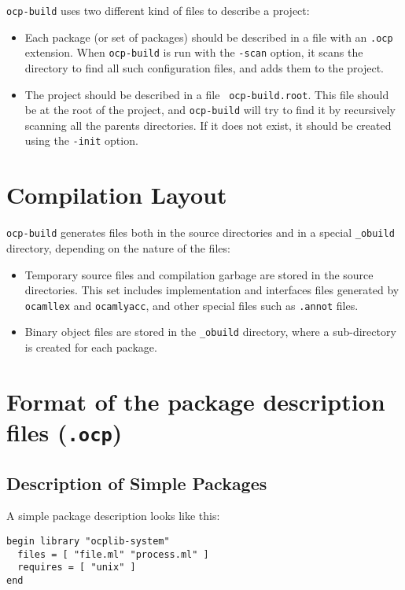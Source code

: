  {\tt ocp-build} uses two different kind of files to describe a project:
\begin{itemize}
\item Each package (or set of packages) should be described in a file
  with an {\tt .ocp} extension. When {\tt ocp-build} is run with the
  {\tt -scan} option, it scans the directory to find all such
  configuration files, and adds them to the project.
\item The project should be described in a file {\tt
  ocp-build.root}. This file should be at the root of the project, and
  {\tt ocp-build} will try to find it by recursively scanning all the
  parents directories. If it does not exist, it should be created using
  the {\tt -init} option.
\end{itemize}

\section{Compilation Layout}

{\tt ocp-build} generates files both in the source directories and in
a special {\tt \_obuild} directory, depending on the nature of the
files:
\begin{itemize}
\item Temporary source files and compilation garbage are stored in the
  source directories. This set includes implementation and interfaces
  files generated by {\tt ocamllex} and {\tt ocamlyacc}, and other
  special files such as {\tt .annot} files.
\item Binary object files are stored in the {\tt \_obuild} directory,
  where a sub-directory is created for each package.
\end{itemize}

\section{Format of the package description files ({\tt .ocp})}

\subsection{Description of Simple Packages}

A simple package description looks like this:

\begin{verbatim}
begin library "ocplib-system"
  files = [ "file.ml" "process.ml" ]
  requires = [ "unix" ]
end
\end{verbatim}

